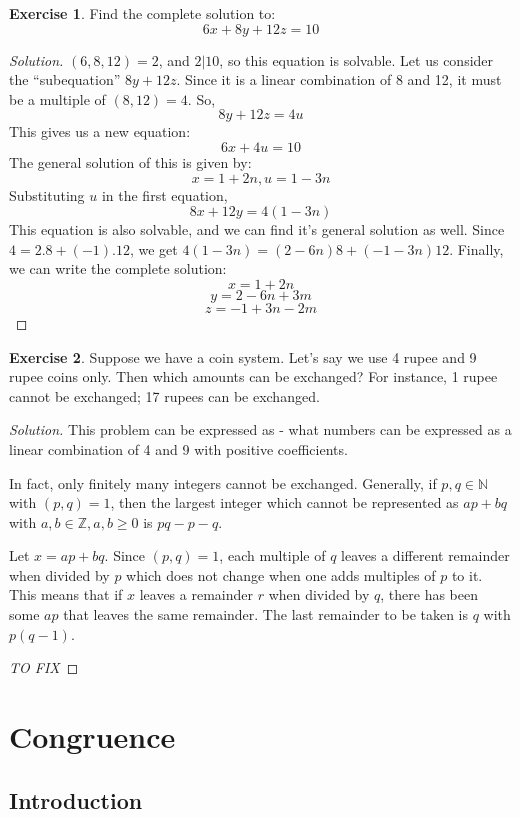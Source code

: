 \documentclass[12pt,letterpaper]{book}
\theoremstyle{definition}
\newtheorem*{exercise}{Exercise}
\newenvironment{solution}
  {\renewcommand\qedsymbol{$\blacksquare$}\begin{proof}[Solution]}
  {\end{proof}}
\newcommand{\N}{\mathbb{N}}
\newcommand{\Z}{\mathbb{Z}}
\begin{document}
\begin{exercise}
  Find the complete solution to:
  \[6x+8y+12z=10\]
\end{exercise}
\begin{solution}
  $(6,8,12)  = 2$, and $2|10$, so this equation is solvable.
  Let us consider the ``subequation'' $8y+12z$. Since it is a linear combination of 8 and 12, it must be a multiple of $(8,12) = 4$. So,
  \[8y+12z = 4u\]
  This gives us a new equation:
  \[6x+4u = 10\]
  The general solution of this is given by:
  \[x = 1+2n, u = 1-3n\]
  Substituting $u$ in the first equation,
  \[8x+12y = 4(1-3n)\]
  This equation is also solvable, and we can find it's general solution as well. Since $4=2.8 + (-1).12$, we get $4(1-3n) = (2-6n)8 + (-1-3n)12$. Finally, we can write the complete solution:
  \[x = 1+2n\]
  \[y = 2-6n + 3m\]
  \[z = -1+3n -2m\]
\end{solution}

\begin{exercise}
  Suppose we have a coin system. Let's say we use 4 rupee and 9 rupee coins only. Then which amounts can be exchanged? For instance, 1 rupee cannot be exchanged; 17 rupees can be exchanged.
\end{exercise}
\begin{solution}
  This problem can be expressed as - what numbers can be expressed as a linear combination of 4 and 9 with positive coefficients.

  In fact, only finitely many integers cannot be exchanged. Generally, if $p,q \in \N$ with $(p,q) = 1$, then the largest integer which cannot be represented as $ap+bq$ with $a,b \in \Z, a,b \geq 0$ is $pq-p-q$.

  Let $x = ap+bq$. Since $(p,q) = 1$, each multiple of $q$ leaves a different remainder when divided by $p$ which does not change when one adds multiples of $p$ to it. This means that if $x$ leaves a remainder $r$ when divided by $q$, there has been some $ap$ that leaves the same remainder. The last remainder to be taken is $q$ with $p(q-1)$.

  \textit{TO FIX}
\end{solution}

\chapter{Congruence}

\section{Introduction}
\end{document}
